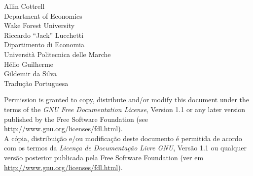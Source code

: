 \documentclass[oneside]{book}
\begin{document}
\renewcommand{\scriptname}{Exemplo}
\renewcommand{\GCR}{\textit{Manual dos Comandos do Gretl}}
\renewcommand{\GUG}{\textit{Manual de Utilização do Gretl}}

\VerbatimFootnotes

\setlength{\parindent}{0pt}
\setlength{\parskip}{1ex}
\setcounter{tocdepth}{1}


\thispagestyle{empty}

\begin{center}



{\large \sffamily
Allin Cottrell\\
Department of Economics\\
Wake Forest University\\

\vspace{20pt}
Riccardo ``Jack'' Lucchetti\\
Dipartimento di Economia\\
Università Politecnica delle Marche\\

\vspace{20pt}
Hélio Guilherme\\
Gildemir da Silva\\
Tradução Portuguesa\\
\vspace{20pt}

}

\end{center}
\clearpage


\thispagestyle{empty}


\vspace*{2in}

Permission is granted to copy, distribute and/or modify this document
under the terms of the \emph{GNU Free Documentation License}, Version
1.1 or any later version published by the Free Software Foundation
(see \url{http://www.gnu.org/licenses/fdl.html}).\\

\vspace{20pt}
A cópia, distribuição e/ou modificação deste documento é permitida de
acordo com os termos da \emph{Licença de Documentação Livre GNU},
Versão 1.1 ou qualquer versão posterior publicada pela Free Software
Foundation (ver em \url{http://www.gnu.org/licenses/fdl.html}).
\end{document}
